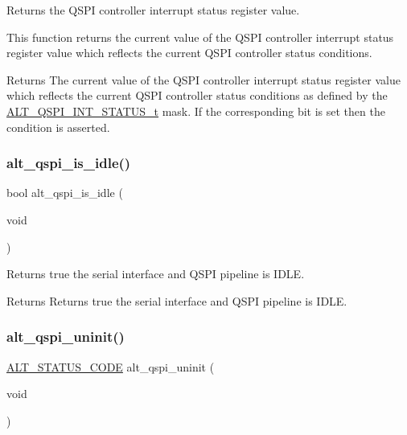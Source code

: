 Returns the Q\+S\+PI controller interrupt status register value.

This function returns the current value of the Q\+S\+PI controller interrupt status register value which reflects the current Q\+S\+PI controller status conditions.

\begin{DoxyReturn}{Returns}
The current value of the Q\+S\+PI controller interrupt status register value which reflects the current Q\+S\+PI controller status conditions as defined by the \mbox{\hyperlink{group__ALT__QSPI__CSR_ga9630d0374a96983752d4053c122665dd}{A\+L\+T\+\_\+\+Q\+S\+P\+I\+\_\+\+I\+N\+T\+\_\+\+S\+T\+A\+T\+U\+S\+\_\+t}} mask. If the corresponding bit is set then the condition is asserted. 
\end{DoxyReturn}
\mbox{\label{group__ALT__QSPI__CSR_gaeaa7e762d8b79b1989385c978174b7b8}} 
\subsubsection{\texorpdfstring{alt\_qspi\_is\_idle()}{alt\_qspi\_is\_idle()}}
{\footnotesize\ttfamily bool alt\+\_\+qspi\+\_\+is\+\_\+idle (\begin{DoxyParamCaption}\item[{void}]{ }\end{DoxyParamCaption})}

Returns true the serial interface and Q\+S\+PI pipeline is I\+D\+LE.

\begin{DoxyReturn}{Returns}
Returns true the serial interface and Q\+S\+PI pipeline is I\+D\+LE. 
\end{DoxyReturn}
\mbox{\label{group__ALT__QSPI__CSR_gae1149191120939cb56f2bea8be12ae3c}} 
\subsubsection{\texorpdfstring{alt\_qspi\_uninit()}{alt\_qspi\_uninit()}}
{\footnotesize\ttfamily \mbox{\hyperlink{hwlib_8h_abdb0d369f069723ca55d6c94bcaaaa12}{A\+L\+T\+\_\+\+S\+T\+A\+T\+U\+S\+\_\+\+C\+O\+DE}} alt\+\_\+qspi\+\_\+uninit (\begin{DoxyParamCaption}\item[{void}]{ }\end{DoxyParamCaption})}

